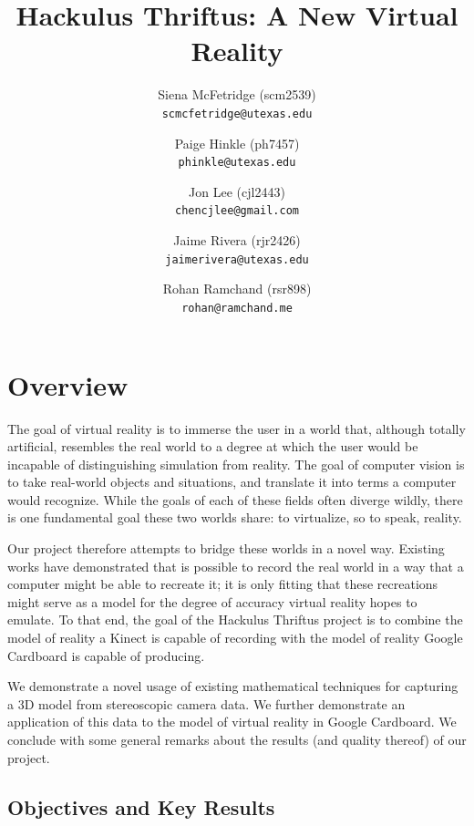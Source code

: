 \documentclass[11pt,oneside,english]{article}
\begin{document}
\title{Hackulus Thriftus: A New Virtual Reality}
\author{Siena McFetridge (scm2539) \\ \texttt{scmcfetridge@utexas.edu}
  \and
  Paige Hinkle (ph7457) \\ \texttt{phinkle@utexas.edu}
  \and
  Jon Lee (cjl2443) \\ \texttt{chencjlee@gmail.com}
  \and
  Jaime Rivera (rjr2426) \\ \texttt{jaimerivera@utexas.edu}
  \and
  Rohan Ramchand (rsr898) \\ \texttt{rohan@ramchand.me}}

\maketitle

\section{Overview}

The goal of virtual reality is to immerse the user in a world that, although
totally artificial, resembles the real world to a degree at which the user would
be incapable of distinguishing simulation from reality. The goal of computer
vision is to take real-world objects and situations, and translate it into terms
a computer would recognize. While the goals of each of these fields often
diverge wildly, there is one fundamental goal these two worlds share: to
virtualize, so to speak, reality.

Our project therefore attempts to bridge these worlds in a novel way. Existing
works have demonstrated that is possible to record the real world in a way
that a computer might be able to recreate it; it is only fitting that these
recreations might serve as a model for the degree of accuracy virtual reality
hopes to emulate. To that end, the goal of the Hackulus Thriftus project is to
combine the model of reality a Kinect is capable of recording with the model
of reality Google Cardboard is capable of producing.

We demonstrate a novel usage of existing mathematical techniques for
capturing a 3D model from stereoscopic camera data. We further demonstrate
an application of this data to the model of virtual reality in Google
Cardboard. We conclude with some general remarks about the results (and
quality thereof) of our project.

\subsection{Objectives and Key Results}
\end{document}
